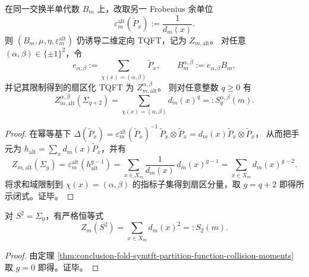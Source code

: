 \begin{corollary}\label{cor:conclusion-sector-resolved-collision-moments-by-genus}
在同一交换半单代数 \(B_m\) 上，改取另一 Frobenius 余单位
\[
\varepsilon_m^{\mathrm{alt}}(\widetilde P_x):=\frac{1}{d_m(x)}.
\]
则 \((B_m,\mu,\eta,\varepsilon_m^{\mathrm{alt}})\) 仍诱导二维定向 TQFT，记为 \(Z_{m,\mathrm{alt}}\)。
对任意 \((\alpha,\beta)\in\{\pm 1\}^2\)，令
\[
e_{\alpha,\beta}:=\sum_{\chi(x)=(\alpha,\beta)}\widetilde P_x,
\qquad
B_m^{\alpha,\beta}:=e_{\alpha,\beta}B_m,
\]
并记其限制得到的扇区化 TQFT 为 \(Z_{m,\mathrm{alt}}^{\alpha,\beta}\)。
则对任意整数 \(q\ge 0\) 有
\[
Z_{m,\mathrm{alt}}^{\alpha,\beta}(\Sigma_{q+2})
=
\sum_{\chi(x)=(\alpha,\beta)} d_m(x)^q
=:S_q^{\alpha,\beta}(m).
\]
\end{corollary}
\begin{proof}
在幂等基下
\(
\Delta(\widetilde P_x)=\varepsilon_m^{\mathrm{alt}}(\widetilde P_x)^{-1}\,\widetilde P_x\otimes \widetilde P_x
=d_m(x)\widetilde P_x\otimes \widetilde P_x
\)，
从而把手元为 \(h_{\mathrm{alt}}=\sum_x d_m(x)\widetilde P_x\)，并有
\[
Z_{m,\mathrm{alt}}(\Sigma_g)=\varepsilon_m^{\mathrm{alt}}(h_{\mathrm{alt}}^{g-1})
=\sum_{x\in X_m}\frac{1}{d_m(x)}\,d_m(x)^{g-1}
=\sum_{x\in X_m}d_m(x)^{g-2}.
\]
将求和域限制到 \(\chi(x)=(\alpha,\beta)\) 的指标子集得到扇区分量，取 \(g=q+2\) 即得所示闭式。证毕。
\end{proof}

\begin{corollary}[球面配分函数与二次碰撞矩]\label{cor:conclusion-tqft-sphere-partition-function-s2}
对 \(S^2=\Sigma_0\)，有严格恒等式
\[
Z_m(S^2)=\sum_{x\in X_m}d_m(x)^2=:S_2(m).
\]
\end{corollary}
\begin{proof}
由定理 \ref{thm:conclusion-fold-symtft-partition-function-collision-moments} 取 \(g=0\) 即得。证毕。
\end{proof}

